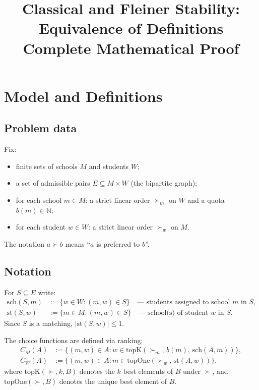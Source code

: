 \documentclass[12pt, a4paper]{article}
\title{\textbf{Classical and Fleiner Stability:\\
Equivalence of Definitions}\\[0.5em]
\large Complete Mathematical Proof}
\author{}
\date{}
\theoremstyle{definition}
\theoremstyle{plain}
\theoremstyle{remark}
\newcommand{\CM}{C_M}
\newcommand{\CW}{C_W}
\newcommand{\school}[2]{\mathrm{sch}(#1,#2)}
\newcommand{\stud}[2]{\mathrm{st}(#1,#2)}
\newcommand{\topK}{\mathrm{topK}}
\newcommand{\topOne}{\mathrm{topOne}}
\newcommand{\quota}{b}
\begin{document}
\maketitle
\tableofcontents
\newpage

\section{Model and Definitions}

\subsection{Problem data}

Fix:
\begin{itemize}
  \item finite sets of schools $M$ and students $W$;
  \item a set of admissible pairs $E \subseteq M \times W$ (the bipartite graph);
  \item for each school $m \in M$: a strict linear order $\succ_m$ on $W$
    and a quota $\quota(m) \in \mathbb{N}$;
  \item for each student $w \in W$: a strict linear order $\succ_w$ on $M$.
\end{itemize}

The notation $a \succ b$ means ``$a$ is preferred to $b$''.

\subsection{Notation}

For $S \subseteq E$ write:
\begin{align*}
  \school{S}{m} &:= \{w \in W : (m,w) \in S\}
    \quad\text{--- students assigned to school } m \text{ in } S,\\
  \stud{S}{w}   &:= \{m \in M : (m,w) \in S\}
    \quad\text{--- school(s) of student } w \text{ in } S.
\end{align*}
Since $S$ is a matching, $|\stud{S}{w}| \leq 1$.

The choice functions are defined via ranking:
\begin{align*}
  \CM(A) &:= \bigl\{(m,w) \in A : w \in \topK(\succ_m,\,\quota(m),\,\school{A}{m})\bigr\},\\
  \CW(A) &:= \bigl\{(m,w) \in A : m \in \topOne(\succ_w,\,\stud{A}{w})\bigr\},
\end{align*}
where $\topK(\succ, k, B)$ denotes the $k$ best elements of $B$ under $\succ$,
and $\topOne(\succ, B)$ denotes the unique best element of $B$.
\end{document}
